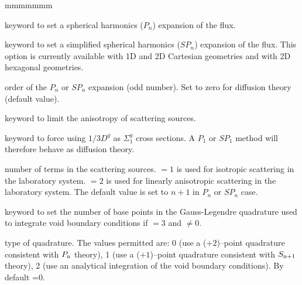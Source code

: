 \begin{ListeDeDescription}{mmmmmmm}
\item[\moc{PN}] keyword to set a spherical harmonics ($P_n$) expansion of the flux.\cite{nse2005}

\item[\moc{SPN}] keyword to set a simplified spherical harmonics ($SP_n$) expansion
of the flux.\cite{nse2005,ane10a} This option is currently available with 1D and 2D Cartesian geometries
and with 2D hexagonal geometries.

\item[\dusa{n}] order of the $P_n$ or $SP_n$ expansion (odd number). Set to zero for diffusion theory (default value).

\item[\moc{SCAT}] keyword to limit the anisotropy of scattering sources.

\item[\moc{DIFF}] keyword to force using $1/3D^{g}$ as $\Sigma_1^{g}$ cross sections. A $P_1$ or $SP_1$ method
will therefore behave as diffusion theory.

\item[\dusa{iscat}] number of terms in the scattering sources.  $=1$ is used for
isotropic scattering in the laboratory system.  $=2$ is used for
linearly anisotropic scattering in the laboratory system. The default value is set to $n+1$
in $P_n$ or $SP_n$ case.

\item[\moc{VOID}] keyword to set the number of base points in the Gauss-Legendre quadrature used to integrate
void boundary conditions if  $=3$ and  $\ne 0$.

\item[\dusa{nvd}] type of quadrature. The values
permitted are: 0 (use a ($+2$)--point quadrature consistent with $P_{{\rm n}}$ theory),
1 (use a ($+1$)--point quadrature consistent with $S_{{\rm n}+1}$ theory),
2 (use an analytical integration of the void boundary conditions). By default =0.

\end{ListeDeDescription}


